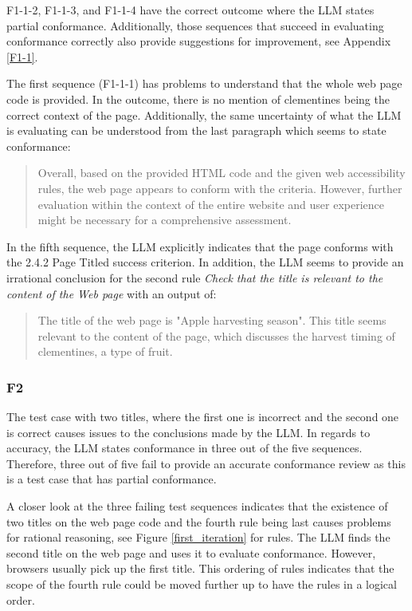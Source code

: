 F1-1-2, F1-1-3, and F1-1-4 have the correct outcome where the LLM states partial conformance. Additionally, those sequences that succeed in evaluating conformance correctly also provide suggestions for improvement, see Appendix \ref{F1-1}.

The first sequence (F1-1-1) has problems to understand that the whole web page code is provided. In the outcome, there is no mention of clementines being the correct context of the page. Additionally, the same uncertainty of what the LLM is evaluating can be understood from the last paragraph which seems to state conformance:

\blockquote{Overall, based on the provided HTML code and the given web accessibility rules, the web page appears to conform with the criteria. However, further evaluation within the context of the entire website and user experience might be necessary for a comprehensive assessment.}

In the fifth sequence, the LLM explicitly indicates that the page conforms with the 2.4.2 Page Titled success criterion. In addition, the LLM seems to provide an irrational conclusion for the second rule \textit{Check that the title is relevant to the content of the Web page} with an output of:

\blockquote{The title of the web page is "Apple harvesting season". This title seems relevant to the content of the page, which discusses the harvest timing of clementines, a type of fruit.}

\subsubsection{F2}

The test case with two titles, where the first one is incorrect and the second one is correct causes issues to the conclusions made by the LLM. In regards to accuracy, the LLM states conformance in three out of the five sequences. Therefore, three out of five fail to provide an accurate conformance review as this is a test case that has partial conformance.

A closer look at the three failing test sequences indicates that the existence of two titles on the web page code and the fourth rule being last causes problems for rational reasoning, see Figure \ref{first_iteration} for rules. The LLM finds the second title on the web page and uses it to evaluate conformance. However, browsers usually pick up the first title. This ordering of rules indicates that the scope of the fourth rule could be moved further up to have the rules in a logical order.

